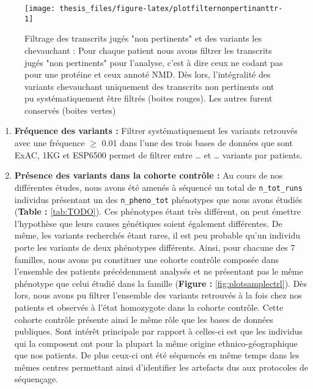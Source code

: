 \documentclass[12pt,twoside]{reedthesis}
\theoremstyle{definition}
\theoremstyle{definition}
\theoremstyle{remark}
\begin{document}
  \newpage \begin{figure}
  
  {\centering \texttt{[image: thesis\_files/figure-latex/plotfilternonpertinanttr-1]} 
  
  }
  
  \caption[Filtrage des transcrits jugés "non pertinents" et des variants les chevauchant]{Filtrage des transcrits jugés "non pertinents" et des variants les chevauchant : Pour chaque patient nous avons filtrer les transcrits jugés "non pertinents" pour l'analyse, c'est à dire ceux ne codant pas pour une protéine et ceux annoté NMD. Dès lors, l'intégralité des variants chevauchant uniquement des transcrits non pertinents ont pu systématiquement être filtrés (boites rouges). Les autres furent conservés (boites vertes)}\label{fig:plotfilternonpertinanttr}
  \end{figure}
  
  \begin{enumerate}
  \def\labelenumi{\arabic{enumi}.}
  \setcounter{enumi}{4}
  \item
    \textbf{Fréquence des variants :} Filtrer systématiquement les
    variants retrouvés avec une fréquence \(\ge\) 0.01 dans l'une des
    trois bases de données que sont ExAC, 1KG et ESP6500 permet de filtrer
    entre \ldots{} et \ldots{} variants par patients.
  \item
    \textbf{Présence des variants dans la cohorte contrôle :} Au cours de
    nos différentes études, nous avons été amenés à séquencé un total de
    \texttt{n\_tot\_runs} individus présentant un des
    \texttt{n\_pheno\_tot} phénotypes que nous avons étudiés
    (\textbf{Table : }\ref{tab:TODO}). Ces phénotypes étant très
    différent, on peut émettre l'hypothèse que leurs causes génétiques
    soient également différentes. De même, les variants recherchés étant
    rares, il est peu probable qu'un individu porte les variants de deux
    phénotypes différents. Ainsi, pour chacune des 7 familles, nous avons
    pu constituer une cohorte contrôle composée dans l'ensemble des
    patients précédemment analysés et ne présentant pas le même phénotype
    que celui étudié dans la famille (\textbf{Figure :}
    \ref{fig:plotsamplectrl}). Dès lors, nous avons pu filtrer l'ensemble
    des variants retrouvés à la fois chez nos patients et observés à
    l'état homozygote dans la cohorte contrôle. Cette cohorte contrôle
    présente ainsi le même rôle que les bases de données publiques. Sont
    intérêt principale par rapport à celles-ci est que les individus qui
    la composent ont pour la plupart la même origine ethnico-géographique
    que nos patients. De plus ceux-ci ont été séquencés en même temps dans
    les mêmes centres permettant ainsi d'identifier les artefacts dus aux
    protocoles de séquençage.
  \end{enumerate}
  
\end{document}
